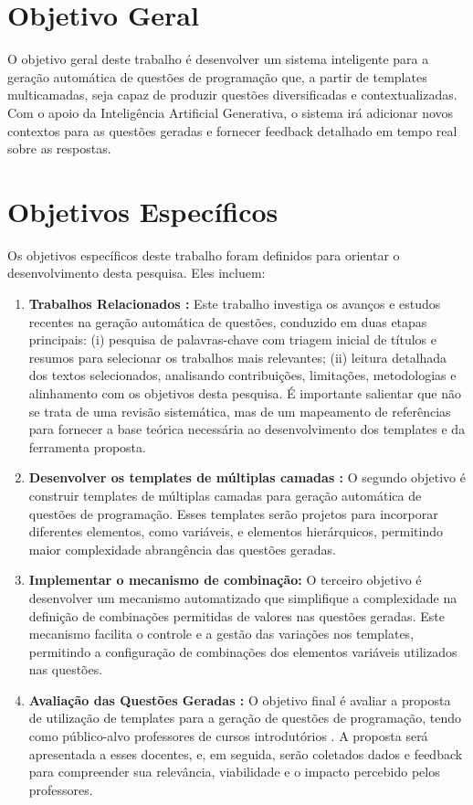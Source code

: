 \section{Objetivo Geral}

O objetivo geral deste trabalho é desenvolver um sistema inteligente para a geração automática de questões de programação que, a partir de templates multicamadas, seja capaz de produzir questões diversificadas e contextualizadas. Com o apoio da Inteligência Artificial Generativa, o sistema irá adicionar novos contextos para as questões geradas e fornecer feedback detalhado em tempo real sobre as respostas.

\section{Objetivos Específicos}

Os objetivos específicos deste trabalho foram definidos para orientar o desenvolvimento desta pesquisa. Eles incluem:

\begin{enumerate}[label=\textbf{\alph*)}]
    \item \textbf{Trabalhos Relacionados :} Este trabalho investiga os avanços e estudos recentes na geração automática de questões, conduzido em duas etapas principais: (i) pesquisa de palavras-chave com triagem inicial de títulos e resumos para selecionar os trabalhos mais relevantes; (ii) leitura detalhada dos textos selecionados, analisando contribuições, limitações, metodologias e alinhamento com os objetivos desta pesquisa. É importante salientar que não se trata de uma revisão sistemática, mas de um mapeamento de referências para fornecer a base teórica necessária ao desenvolvimento dos templates e da ferramenta proposta. 
    \item \textbf{Desenvolver os templates de múltiplas camadas :}  O segundo objetivo é construir templates de múltiplas camadas para geração automática de questões de programação. Esses templates serão projetos para incorporar diferentes elementos, como variáveis, e elementos hierárquicos, permitindo maior complexidade abrangência das questões geradas. 
    \item \textbf{Implementar o mecanismo de combinação:} O terceiro objetivo é desenvolver um mecanismo automatizado que simplifique a complexidade na definição de combinações permitidas de valores nas questões geradas. Este mecanismo facilita o controle e a gestão das variações nos templates, permitindo a configuração de combinações dos elementos variáveis utilizados nas questões.
    \item \textbf{Avaliação das Questões Geradas :}  
O objetivo final é avaliar a proposta de utilização de templates para a geração de questões de programação, tendo como público-alvo professores de cursos introdutórios . A proposta será apresentada a esses docentes, e, em seguida, serão coletados dados e feedback para compreender sua relevância, viabilidade e o impacto percebido pelos professores.

 
\end{enumerate}


